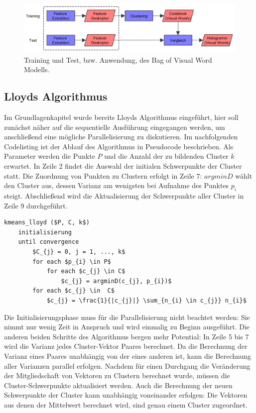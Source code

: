 \begin{figure}
	\centering
	\includegraphics[scale=0.45]{images/bovw.png}
	\caption{Training und Test, bzw. Anwendung, des Bag of Visual Word Modells. }
	\label{img:bovw}
\end{figure}


\subsection{Lloyds Algorithmus}

Im Grundlagenkapitel wurde bereits Lloyds Algorithmus eingeführt, hier soll zunächst näher auf die sequentielle Ausführung eingegangen werden, um anschließend eine mögliche Parallelisierung zu diskutieren. Im nachfolgenden Codelisting ist der Ablauf des Algorithmus in Pseudocode beschrieben. Als Parameter werden die Punkte $P$ und die Anzahl der zu bildenden Cluster $k$ erwartet. In Zeile 2 findet die Auswahl der initialen Schwerpunkte der Cluster statt. Die Zuordnung von Punkten zu Clustern erfolgt in Zeile 7: $argminD$ wählt den Cluster aus, dessen Varianz am wenigsten bei Aufnahme des Punktes $p_{i}$ steigt. Abschließend wird die Aktualisierung der Schwerpunkte aller Cluster in Zeile 9 durchgeführt.

\lstset{language=C}
\begin{lstlisting}[mathescape=true]
kmeans_lloyd ($P, C, k$)
	initialisierung
	until convergence
		$C_{j} = 0, j = 1, ..., k$
		for each $p_{i} \in P$
			for each $c_{j} \in C$
				$c_{j} = argminD(c_{j}, p_{i})$		
		for each $c_{j} \in  C$
			$c_{j} = \frac{1}{|c_{j}|} \sum_{n_{i} \in c_{j}} n_{i}$
\end{lstlisting}

Die Initialisierungsphase muss für die Parallelisierung nicht beachtet werden: Sie nimmt nur wenig Zeit in Anspruch und wird einmalig zu Beginn ausgeführt. Die anderen beiden Schritte des Algorithmus bergen mehr Potential: In Zeile 5 bis 7 wird die Varianz jedes Cluster-Vektor Paares berechnet. Da die Berechnung der Varianz eines Paares unabhängig von der eines anderen ist, kann die Berechnung aller Varianzen parallel erfolgen. Nachdem für einen Durchgang die Veränderung der Mitgliedschaft von Vektoren zu Clustern berechnet wurde, müssen die Cluster-Schwerpunkte aktualisiert werden. Auch die Berechnung der neuen Schwerpunkte der Cluster kann unabhängig voneinander erfolgen: Die Vektoren aus denen der Mittelwert berechnet wird, sind genau einem Cluster zugeordnet.

